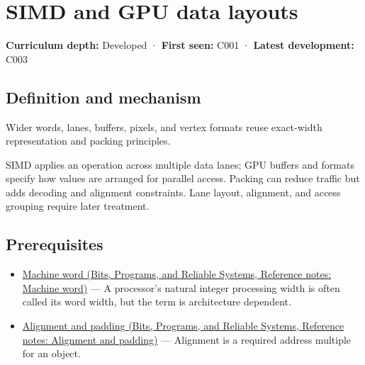 \hypertarget{appendix-3c7b1a56de01}{}\label{referencestart:appendix-3c7b1a56de01}
\section{SIMD and GPU data layouts}\label{appendix-3c7b1a56de01-simd-and-gpu-data-layouts}

\hypertarget{appendix-3c7b1a56de01-simd-and-gpu-data-layouts}{}

\textbf{Curriculum depth:} Developed · \textbf{First seen:} C001 · \textbf{Latest development:} C003

\begin{allmightroledefinition}

\subsection{Definition and mechanism}\label{appendix-3c7b1a56de01-definition-and-mechanism}

\hypertarget{appendix-3c7b1a56de01-definition-and-mechanism}{}

Wider words, lanes, buffers, pixels, and vertex formats reuse exact-width representation and packing principles.

\end{allmightroledefinition}

SIMD applies an operation across multiple data lanes; GPU buffers and formats specify how values are arranged for parallel access. Packing can reduce traffic but adds decoding and alignment constraints. Lane layout, alignment, and access grouping require later treatment.

\subsection{Prerequisites}\label{appendix-3c7b1a56de01-prerequisites}

\hypertarget{appendix-3c7b1a56de01-prerequisites}{}

\begin{itemize}
\tightlist
\item
  \href{../01-Bits-Programs-and-Reliable-Systems/main.pdf\#nameddest=appendix-d67a19507dc5}{Machine word (Bits, Programs, and Reliable Systems, Reference notes: Machine word)} --- A processor's natural integer processing width is often called its word width, but the term is architecture dependent.
\item
  \href{../01-Bits-Programs-and-Reliable-Systems/main.pdf\#nameddest=appendix-a1f7c53b4742}{Alignment and padding (Bits, Programs, and Reliable Systems, Reference notes: Alignment and padding)} --- Alignment is a required address multiple for an object.
\end{itemize}

